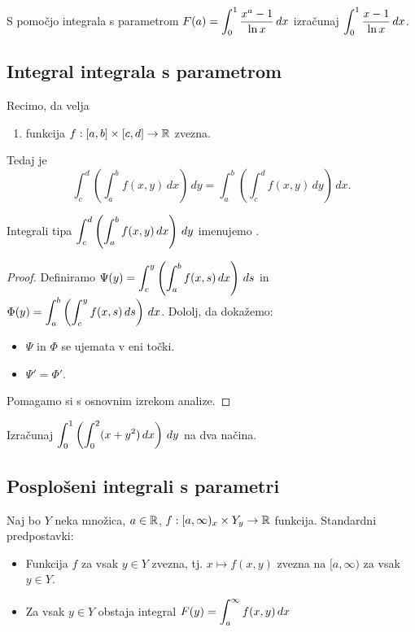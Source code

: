 \begin{zgled}
    S pomočjo integrala s parametrom $\displaystyle F(a) = \int_{0}^{1} \frac{x^a-1}{\ln x} \,dx $ izračunaj $\displaystyle \int_{0}^{1} \frac{x-1}{\ln x} \,dx $.
\end{zgled}

\subsection{Integral integrala s parametrom}
\begin{izrek}
    Recimo, da velja
    \begin{enumerate}
        \item funkcija \(f:[a,b] \times [c,d] \to \mathbb{R}\) zvezna.
    \end{enumerate}
    Tedaj je 
    $$\int_{c}^{d} \left(\int_{a}^{b} f(x,y) \,dx \right) \,dy =  \int_{a}^{b} \left(\int_{c}^{d} f(x,y) \,dy \right) \,dx.$$
\end{izrek}

\begin{definicija}
    Integrali tipa $\displaystyle \int_{c}^{d} \left(\int_{a}^{b} f(x,y) \,dx \right) \,dy$ imenujemo . 
\end{definicija}

\begin{proof}
    Definiramo $\displaystyle \Psi(y) = \int_{c}^{y} \left(\int_{a}^{b} f(x,s) \,dx \right) \,ds $ in $\displaystyle \Phi(y) = \int_{a}^{b} \left(\int_{c}^{y} f(x,s) \,ds \right) \,dx$. Dololj, da dokažemo:
    \begin{itemize}
        \item $\Psi$ in $\Phi$ se ujemata v eni točki.
        \item $\Psi' = \Phi'$.
    \end{itemize}
    Pomagamo si s osnovnim izrekom analize.
\end{proof}

\begin{zgled}
    Izračunaj $\displaystyle \int_{0}^{1} \left(\int_{0}^{2} (x + y^2)  \,dx \right)  \,dy $ na dva načina.
\end{zgled}

\subsection{Posplošeni integrali s parametri}
Naj bo $Y$ neka množica, $a \in \mathbb{R}$, $f: [a, \infty)_x \times Y_y \to \mathbb{R}$ funkcija. Standardni predpostavki:
\begin{itemize}
    \item Funkcija $f$ za vsak $y \in Y$ zvezna, tj. $x \mapsto f(x,y)$ zvezna na $[a, \infty)$ za vsak \(y \in Y\).
    \item Za vsak \(y \in Y\) obstaja integral \( \displaystyle F(y)= \int_{a}^{\infty} f(x,y) \,dx \)
\end{itemize}

